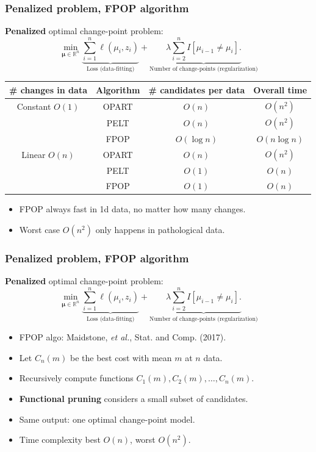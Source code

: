 \documentclass{beamer}
\newcommand{\algo}[1]{\textcolor{#1}{#1}}
\newcommand{\RR}{\mathbb R}
\newcommand{\algo}[1]{\textcolor{#1}{#1}}
\begin{document}
\begin{frame}
  \frametitle{Penalized problem, FPOP algorithm}
  \textbf{Penalized} optimal change-point problem:
$$
\min_{
  \mathbf \mu\in\RR^{n}
}
\underbrace{\sum_{i=1}^{n} \ell( \mu_i,  z_i)}_{\text{Loss (data-fitting)}} + \underbrace{\lambda\sum_{i=2}^n I[\mu_{i-1}\neq \mu_i].}_{\text{Number of change-points (regularization)}}
$$
\begin{tabular}{cccc}
  \# changes in data & Algorithm & \# candidates per data & Overall time \\
  \hline
  Constant $O(1)$ & \algo{OPART} &  $O(n)$ & $O(n^2)$\\
                     & \algo{PELT} &  $O(n)$ & $O(n^2)$\\
                     & \algo{FPOP} &  \textcolor{FPOP}{$O(\log n)$} & \textcolor{FPOP}{$O(n\log n)$}\\
  \hline
  Linear $O(n)$ & \algo{OPART} &  $O(n)$ & $O(n^2)$ \\
   & \algo{PELT} &  \textcolor{PELT}{$O(1)$} & \textcolor{PELT}{$O(n)$} \\
   & \algo{FPOP} &  \textcolor{FPOP}{$O(1)$} & \textcolor{FPOP}{$O(n)$} \\
\end{tabular}

\begin{itemize}
\item FPOP always fast in 1d data, no matter how many changes.
\item Worst case $O(n^2)$ only happens in pathological data.
\end{itemize}
\end{frame}

\begin{frame}
  \frametitle{Penalized problem, FPOP algorithm}
  \textbf{Penalized} optimal change-point problem:
$$
\min_{
  \mathbf \mu\in\RR^{n}
}
\underbrace{\sum_{i=1}^{n} \ell( \mu_i,  z_i)}_{\text{Loss (data-fitting)}} + \underbrace{\lambda\sum_{i=2}^n I[\mu_{i-1}\neq \mu_i].}_{\text{Number of change-points (regularization)}}
$$
\begin{itemize}
\item FPOP algo: Maidstone, \emph{et al.}, Stat. and Comp. (2017).
\item Let $C_n(m)$ be the best cost with mean $m$ at $n$ data.
\item Recursively compute functions $C_{1}(m), C_2(m),\dots, C_{n}(m)$.
\item \textbf{Functional pruning} considers a small subset of candidates.
\item Same output: one optimal change-point model.
\item Time complexity best $O(n)$, worst $O(n^2)$.
\end{itemize}
\end{frame}
\end{document}
